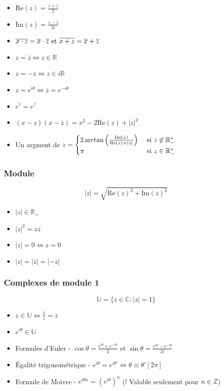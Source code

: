 \documentclass[openany]{book}
\begin{document}
\begin{itemize}
    \item $\text{Re} (z) = \frac{z+\overline{z}}{2}$
    \item $\text{Im} (z) = \frac{z-\overline{z}}{2i}$
    \item $\overline{x\cdot z} = \overline{x} \cdot \overline{z} \text{ et } \overline{x+z} = \overline{x} + \overline{z}$
    \item $z=\overline{z} \iff z \in \mathbb{R}$
    \item $z=-\overline{z} \iff z \in i\mathbb{R}$
    \item $ z=e^{i\theta} \iff \overline{z}=e^{-i\theta} $
    \item $ \overline{e^z} = e^{\overline{z}} $
    \item $ (x-z)(x-\overline{z}) = x^2 - 2 \text{Re}(z) + |z|^2 $
    \item Un argment de $z = \begin{cases}
        2\arctan \left( \frac{\text{Im}(z)}{\text{Re}(z) + |z|} \right) & \text{ si } z \not \in \mathbb{R}_-^* \\
        \pi & \text{ si } z \in \mathbb{R}_-^*
    \end{cases}$
\end{itemize}

\subsubsection{Module}
\[ |z| = \sqrt{\text{Re}(z)^2 + \text{Im}(z)^2} \]

\begin{itemize}
    \item $ |z| \in \mathbb{R}_+ $
    \item $|z|^2 = z\overline{z}$
    \item $ |z| = 0 \iff z = 0 $
    \item $ |z| = |\overline{z}| = |-z| $
\end{itemize}

\subsubsection{Complexes de module 1}

\[ \mathbb{U}=\{z\in\mathbb{C}:|z|=1\} \]

\begin{itemize}
    \item $z\in\mathbb{U} \iff \frac{1}{z}=\overline{z}$
    \item $ e^{i\theta} \in \mathbb{U} $
    \item Formules d'Euler - $ \cos{\theta}=\frac{e^{i\theta} + e^{-i\theta}}{2} \text{ et } \sin{\theta}=\frac{e^{i\theta} - e^{-i\theta}}{2i} $
    \item Égalité trigonométrique - $ e^{i\theta} = e^{i\theta '} \iff \theta \equiv \theta' [2\pi] $
    \item Formule de Moivre - $e^{i\theta n} = (e^{i\theta})^n $ (! Valable seulement pour $ n \in \mathbb{Z} $)
\end{itemize}
\end{document}
